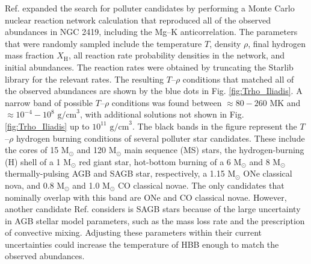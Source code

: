 Ref. \cite{Iliadis2016} expanded the search for polluter candidates by performing a Monte Carlo nuclear reaction network calculation that reproduced all of the observed abundances in NGC 2419, including the Mg--K anticorrelation. The parameters that were randomly sampled include the temperature $T$, density $\rho$, final hydrogen mass fraction $X_{\mathrm{H}}$, all reaction rate probability densities in the network, and initial abundances. The reaction rates were obtained by truncating the Starlib \cite{Sallaska2013} library for the relevant rates. The resulting $T$--$\rho$ conditions that matched all of the observed abundances are shown by the blue dots in Fig. \ref{fig:Trho_Iliadis}. A narrow band of possible $T$--$\rho$ conditions was found between $\approx80-260$ MK and $\approx10^{-4}-10^{8}$ $\mathrm{g/cm}^{3}$, with additional solutions not shown in Fig. \ref{fig:Trho_Iliadis} up to $10^{11}$ $\mathrm{g/cm}^{3}$. The black bands in the figure represent the $T$--$\rho$ hydrogen burning conditions of several polluter star candidates. These include the cores of 15 $\mathrm{M}_{\odot}$ and 120 $\mathrm{M}_{\odot}$ main sequence (MS) stars, the hydrogen-burning (H) shell of a 1 $\mathrm{M}_{\odot}$ red giant star, hot-bottom burning of a 6 $\mathrm{M}_{\odot}$ and 8 $\mathrm{M}_{\odot}$ thermally-pulsing AGB and SAGB star, respectively, a 1.15 $\mathrm{M}_{\odot}$ ONe classical nova, and 0.8 $\mathrm{M}_{\odot}$ and 1.0 $\mathrm{M}_{\odot}$ CO classical novae. The only candidates that nominally overlap with this band are ONe and CO classical novae. However, another candidate Ref. \cite{Iliadis2016} considers is SAGB stars because of the large uncertainty in AGB stellar model parameters, such as the mass loss rate and the prescription of convective mixing. Adjusting these parameters within their current uncertainties could increase the temperature of HBB enough to match the observed abundances.



